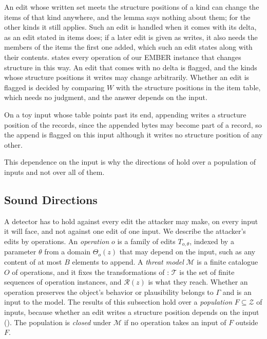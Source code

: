 An edit whose written set meets the structure positions of a kind can change the items of that kind anywhere, and the
lemma says nothing about them; for the other kinds it still applies. Such an edit is handled when it comes with its
delta, as an edit stated in items does; if a later edit is given as writes, it also needs the members of the items the
first one added, which such an edit states along with their contents.  states every operation of
our EMBER instance that changes structure in this way. An edit that comes with no delta is flagged, and the kinds
whose structure positions it writes may change arbitrarily. Whether an edit is flagged is decided by comparing $W$
with the structure positions in the item table, which needs no judgment, and the answer depends on the input.
\begin{runex}
On a toy input whose table points past its end, appending writes a structure position of the records, since the
appended bytes may become part of a record, so the append is flagged on this input although it writes no structure
position of any other.
\end{runex}
\noindent This dependence on the input is why the directions of  hold over a population of
inputs and not over all of them.

\subsection{Sound Directions}
\label{sec:fw:directions}

A detector has to hold against every edit the attacker may make, on every input it will face, and not against one edit
of one input. We describe the attacker's edits by operations. An \emph{operation} $o$ is a family of edits
$T_{o,\theta}$, indexed by a parameter $\theta$ from a domain $\Theta_o(z)$ that may depend on the input, such as any
content of at most $B$ elements to append. A \emph{threat model} $\mathcal{M}$ is a finite catalogue $O$ of
operations, and it fixes the transformations of : $\mathcal{T}$ is the set of finite sequences of
operation instances, and $\mathcal{R}(z)$ is what they reach. Whether an operation preserves the object's behavior or
plausibility belongs to $\Gamma$ and is an input to the model. The results of this subsection hold over a
\emph{population} $F \subseteq \mathcal{Z}$ of inputs, because whether an edit writes a structure position depends on
the input (). The population is \emph{closed} under $\mathcal{M}$ if no operation takes an input of
$F$ outside $F$.


